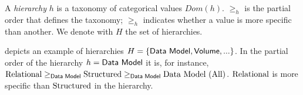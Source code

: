\begin{definition}[Hierarchy]
A \emph{hierarchy} $h$ is a taxonomy of categorical values $Dom(h)$. $\geq_{h}$ is the partial order that defines the taxonomy; $\geq_{h}$ indicates whether a value is more specific than another. We denote with $H$ the set of hierarchies.
\end{definition}

\begin{example}
 depicts an example of hierarchies $H=\{\sf{Data Model}, \sf{Volume}, ...\}$. In the partial order of the hierarchy $h=\sf{Data Model}$ it is, for instance, $\textup{Relational}\geq_{\sf{Data Model}} \textup{Structured} \geq_{\sf{Data Model}} \textup{Data Model (All)}$. $\textup{Relational}$ is more specific than $\textup{Structured}$ in the  hierarchy.
\end{example}

